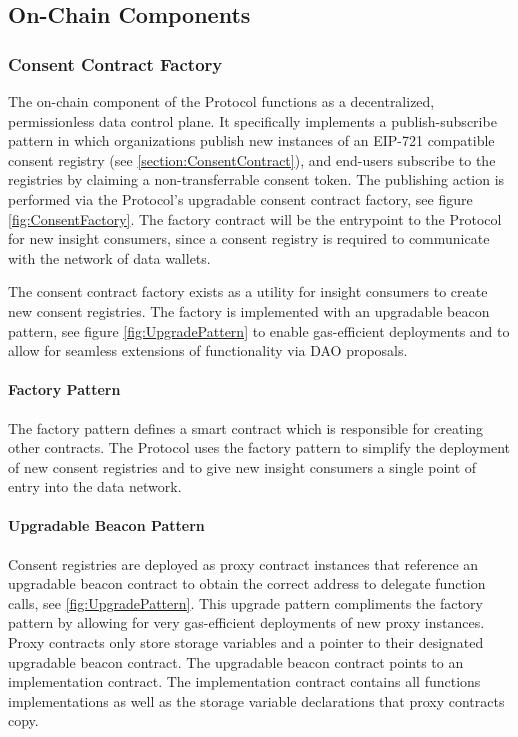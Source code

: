 \subsection{On-Chain Components}
\label{section:OnChain}

\subsubsection{Consent Contract Factory}


The on-chain component of the Protocol functions as a decentralized, permissionless data control plane. It specifically implements a publish-subscribe pattern
in which organizations publish new instances of an EIP-721 compatible consent registry (see \ref{section:ConsentContract}), and end-users 
subscribe to the registries by claiming a non-transferrable consent token. The publishing action is performed via the Protocol's upgradable 
consent contract factory, see figure \ref{fig:ConsentFactory}. The factory contract will be the entrypoint to the Protocol for new insight 
consumers, since a consent registry is required to communicate with the network of data wallets. 


The consent contract factory exists as a utility for insight consumers to create new consent registries. The factory is implemented with an 
upgradable beacon pattern, see figure \ref{fig:UpgradePattern} to enable gas-efficient deployments and to allow for seamless extensions of functionality
via DAO proposals. 

\paragraph{Factory Pattern}
The factory pattern defines a smart contract which is responsible for creating other contracts. The Protocol uses the factory 
pattern to simplify the deployment of new consent registries and to give new insight consumers a single point of entry into the data network. 

\paragraph{Upgradable Beacon Pattern}
\label{section:BeaconPattern}

Consent registries are deployed as proxy contract instances that reference an upgradable beacon contract to obtain the correct address to delegate
function calls, see \ref{fig:UpgradePattern}. This upgrade pattern compliments the factory pattern by allowing for very gas-efficient deployments 
of new proxy instances. Proxy contracts only store storage variables and a pointer to their designated upgradable beacon contract. The upgradable 
beacon contract points to an implementation contract. The implementation contract contains all functions implementations as well as the storage
variable declarations that proxy contracts copy. 

